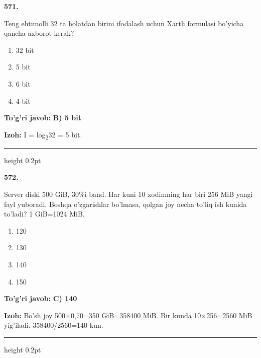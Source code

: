 \documentclass[10pt,a4paper,oneside]{article}
\begin{document}
\noindent\textbf{\color{ink}571.}
\par
Teng ehtimolli 32 ta holatdan birini ifodalash uchun Xartli formulasi bo'yicha qancha axborot kerak?
\begin{enumerate}[label=\Alph*),leftmargin=9mm]
\item 32 bit
\item 5 bit
\item 6 bit
\item 4 bit
\end{enumerate}
\begin{tcolorbox}[enhanced,breakable,colback=teal!4,colframe=teal!50!black,boxrule=0.5pt,arc=1.1mm,left=3mm,right=3mm,top=1.7mm,bottom=1.7mm,before skip=2mm,after skip=2mm]
\textbf{\color{teal}To'g'ri javob:} \textbf{B) 5 bit}
\par\smallskip
\textbf{Izoh:} I = log\textsubscript{2}32 = 5 bit.
\end{tcolorbox}
\vspace{2mm}\hrule height 0.2pt \vspace{3mm}

\noindent\textbf{\color{ink}572.}
\par
Server diski 500 GiB, 30\%i band. Har kuni 10 xodimning har biri 256 MiB yangi fayl yuboradi. Boshqa o'zgarishlar bo'lmasa, qolgan joy necha to'liq ish kunida to'ladi? 1 GiB=1024 MiB.
\begin{enumerate}[label=\Alph*),leftmargin=9mm]
\item 120
\item 130
\item 140
\item 150
\end{enumerate}
\begin{tcolorbox}[enhanced,breakable,colback=teal!4,colframe=teal!50!black,boxrule=0.5pt,arc=1.1mm,left=3mm,right=3mm,top=1.7mm,bottom=1.7mm,before skip=2mm,after skip=2mm]
\textbf{\color{teal}To'g'ri javob:} \textbf{C) 140}
\par\smallskip
\textbf{Izoh:} Bo'sh joy 500\ensuremath{\times}0,70=350 GiB=358400 MiB. Bir kunda 10\ensuremath{\times}256=2560 MiB yig'iladi. 358400/2560=140 kun.
\end{tcolorbox}
\vspace{2mm}\hrule height 0.2pt \vspace{3mm}
\end{document}
